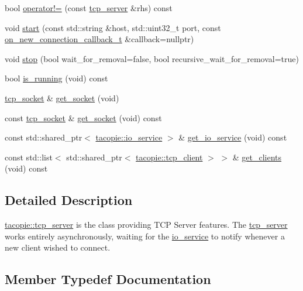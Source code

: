 \begin{DoxyCompactItemize}
\item 
bool \hyperlink{classtacopie_1_1tcp__server_aa45611b77d60b536aeaf626d1724342d}{operator!=} (const \hyperlink{classtacopie_1_1tcp__server}{tcp\+\_\+server} \&rhs) const
\item 
void \hyperlink{classtacopie_1_1tcp__server_a6cb98b50d865b32dba497273a0eca1e9}{start} (const std\+::string \&host, std\+::uint32\+\_\+t port, const \hyperlink{classtacopie_1_1tcp__server_a103cb4e6fcab00f88a708aabd38b66ff}{on\+\_\+new\+\_\+connection\+\_\+callback\+\_\+t} \&callback=nullptr)
\item 
void \hyperlink{classtacopie_1_1tcp__server_abc099e162432e2218faed93fc84180fd}{stop} (bool wait\+\_\+for\+\_\+removal=false, bool recursive\+\_\+wait\+\_\+for\+\_\+removal=true)
\item 
bool \hyperlink{classtacopie_1_1tcp__server_a76162141e6443953f3ad8e11c4e4d3d7}{is\+\_\+running} (void) const
\item 
\hyperlink{classtacopie_1_1tcp__socket}{tcp\+\_\+socket} \& \hyperlink{classtacopie_1_1tcp__server_a39a51b9203d42babfd9c4c1a0f4cc340}{get\+\_\+socket} (void)
\item 
const \hyperlink{classtacopie_1_1tcp__socket}{tcp\+\_\+socket} \& \hyperlink{classtacopie_1_1tcp__server_a373aec294e24a52c3ef6c44920af36e2}{get\+\_\+socket} (void) const
\item 
const std\+::shared\+\_\+ptr$<$ \hyperlink{classtacopie_1_1io__service}{tacopie\+::io\+\_\+service} $>$ \& \hyperlink{classtacopie_1_1tcp__server_aace4796627b6abccccce1a541908414f}{get\+\_\+io\+\_\+service} (void) const
\item 
const std\+::list$<$ std\+::shared\+\_\+ptr$<$ \hyperlink{classtacopie_1_1tcp__client}{tacopie\+::tcp\+\_\+client} $>$ $>$ \& \hyperlink{classtacopie_1_1tcp__server_a0df81b943243ad51102c37d4944be8d7}{get\+\_\+clients} (void) const
\end{DoxyCompactItemize}


\subsection{Detailed Description}
\hyperlink{classtacopie_1_1tcp__server}{tacopie\+::tcp\+\_\+server} is the class providing T\+CP Server features. The \hyperlink{classtacopie_1_1tcp__server}{tcp\+\_\+server} works entirely asynchronously, waiting for the \hyperlink{classtacopie_1_1io__service}{io\+\_\+service} to notify whenever a new client wished to connect. 

\subsection{Member Typedef Documentation}
\mbox{\label{classtacopie_1_1tcp__server_a103cb4e6fcab00f88a708aabd38b66ff}} 
